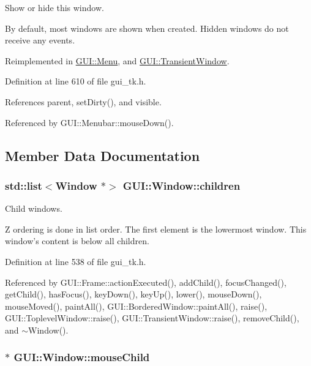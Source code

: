 Show or hide this window. 

By default, most windows are shown when created. Hidden windows do not receive any events. 

Reimplemented in \hyperlink{classGUI_1_1Menu_aa98bb7305b74088dd875ead6747cfa52}{G\-U\-I\-::\-Menu}, and \hyperlink{classGUI_1_1TransientWindow_a5581ee490ae2ce490ca45e234f6712a2}{G\-U\-I\-::\-Transient\-Window}.



Definition at line 610 of file gui\-\_\-tk.\-h.



References parent, set\-Dirty(), and visible.



Referenced by G\-U\-I\-::\-Menubar\-::mouse\-Down().



\subsection{Member Data Documentation}
\hypertarget{classGUI_1_1Window_ac10e617306be4367ed164ea97f5d3132}{
\subsubsection[{children}]{\setlength{\rightskip}{0pt plus 5cm}std\-::list$<${\bf Window} $\ast$$>$ {\bf G\-U\-I\-::\-Window\-::children}}}\label{classGUI_1_1Window_ac10e617306be4367ed164ea97f5d3132}


Child windows. 

Z ordering is done in list order. The first element is the lowermost window. This window's content is below all children. 

Definition at line 538 of file gui\-\_\-tk.\-h.



Referenced by G\-U\-I\-::\-Frame\-::action\-Executed(), add\-Child(), focus\-Changed(), get\-Child(), has\-Focus(), key\-Down(), key\-Up(), lower(), mouse\-Down(), mouse\-Moved(), paint\-All(), G\-U\-I\-::\-Bordered\-Window\-::paint\-All(), raise(), G\-U\-I\-::\-Toplevel\-Window\-::raise(), G\-U\-I\-::\-Transient\-Window\-::raise(), remove\-Child(), and $\sim$\-Window().

\hypertarget{classGUI_1_1Window_addd401dab430594e678366e7ff73ef2d}{
\subsubsection[{mouse\-Child}]{$\ast$ {\bf G\-U\-I\-::\-Window\-::mouse\-Child}}}\label{classGUI_1_1Window_addd401dab430594e678366e7ff73ef2d}


